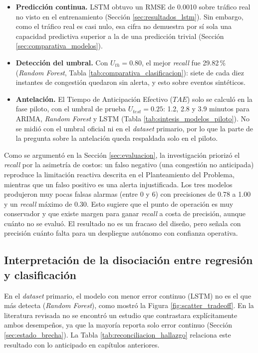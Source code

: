 \documentclass[12pt]{report}
\begin{document}
\begin{itemize}
    \item \textbf{Predicción continua.} LSTM obtuvo un RMSE de 0.0010 sobre tráfico real no visto en el entrenamiento (Sección \ref{sec:resultados_lstm}). Sin embargo, como el tráfico real es casi nulo, esa cifra no demuestra por sí sola una capacidad predictiva superior a la de una predicción trivial (Sección \ref{sec:comparativa_modelos}).
    \item \textbf{Detección del umbral.} Con $U_{th}=0.80$, el mejor \textit{recall} fue 29.82\,\% (\textit{Random Forest}, Tabla \ref{tab:comparativa_clasificacion}): siete de cada diez instantes de congestión quedaron sin alerta, y esto sobre eventos sintéticos.
    \item \textbf{Antelación.} El Tiempo de Anticipación Efectivo ($TAE$) solo se calculó en la fase piloto, con el umbral de prueba $U_{test}=0.25$: 1.2, 2.8 y 3.9 minutos para ARIMA, \textit{Random Forest} y LSTM (Tabla \ref{tab:sintesis_modelos_piloto}). No se midió con el umbral oficial ni en el \textit{dataset} primario, por lo que la parte de la pregunta sobre la antelación queda respaldada solo en el piloto.
\end{itemize}

Como se argumentó en la Sección \ref{sec:evaluacion}, la investigación priorizó el \textit{recall} por la asimetría de costos: un falso negativo (una congestión no anticipada) reproduce la limitación reactiva descrita en el Planteamiento del Problema, mientras que un falso positivo es una alerta injustificada. Los tres modelos produjeron muy pocas falsas alarmas (entre 0 y 6) con precisiones de 0.78 a 1.00 y un \textit{recall} máximo de 0.30. Esto sugiere que el punto de operación es muy conservador y que existe margen para ganar \textit{recall} a costa de precisión, aunque cuánto no se evaluó. El resultado no es un fracaso del diseño, pero señala con precisión cuánto falta para un despliegue autónomo con confianza operativa.

\subsection*{Interpretación de la disociación entre regresión y clasificación}

En el \textit{dataset} primario, el modelo con menor error continuo (LSTM) no es el que más detecta (\textit{Random Forest}), como mostró la Figura \ref{fig:scatter_tradeoff}. En la literatura revisada no se encontró un estudio que contrastara explícitamente ambos desempeños, ya que la mayoría reporta solo error continuo (Sección \ref{sec:estado_brecha}). La Tabla \ref{tab:reconciliacion_hallazgo} relaciona este resultado con lo anticipado en capítulos anteriores.
\end{document}
